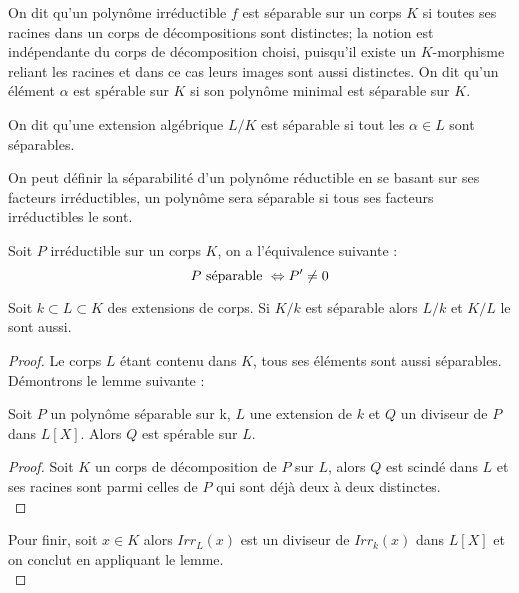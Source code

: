 \documentclass[a4paper]{article} %
\numberwithin{section}{part}
\numberwithin{equation}{section}
\begin{document}
\vspace{0.3cm}

On dit qu'un polynôme irréductible $f$ est séparable sur un corps $K$ si toutes
ses racines dans un corps de décompositions sont distinctes; la notion est
indépendante du corps de décomposition choisi, puisqu'il existe un $K$-morphisme
reliant les racines et dans ce cas leurs images sont aussi distinctes. On dit
qu'un élément $\alpha$ est spérable sur $K$ si son polynôme minimal est 
séparable sur $K$.

\begin{defn}
\label{def:sep}
On dit qu'une extension algébrique $L/K$ est séparable si tout les $\alpha\in L$
sont séparables.
\end{defn}

\begin{rem}
On peut définir la séparabilité d'un polynôme réductible en se basant sur ses
facteurs irréductibles, un polynôme sera séparable si tous ses facteurs
irréductibles le sont.
\end{rem}

\begin{prop}
\label{prop:sepderiv}
Soit $P$ irréductible sur un corps $K$, on a l'équivalence suivante :
\[P\textup{ séparable } \Leftrightarrow P'\neq 0\]
\end{prop}

\begin{prop}
Soit $k \subset L \subset K$ des extensions de corps. Si $K/k$ est séparable
alors $L/k$ et $K/L$ le sont aussi.
\end{prop}
\begin{proof}
Le corps $L$ étant contenu dans $K$, tous ses éléments sont aussi séparables.
Démontrons le lemme suivante :
\begin{lem}
\label{lem:divsep}
Soit $P$ un polynôme séparable sur k, $L$ une extension de $k$ et $Q$ un
diviseur de $P$ dans $L[X]$. Alors $Q$ est spérable sur $L$.
\end{lem}
\begin{proof}
Soit $K$ un corps de décomposition de $P$ sur $L$, alors $Q$ est scindé dans $L$
et ses racines sont parmi celles de $P$ qui sont déjà deux à deux distinctes.\\
\end{proof}
Pour finir, soit $x\in K$ alors $Irr_L(x)$ est un diviseur de $Irr_k(x)$ dans
$L[X]$ et on conclut en appliquant le lemme.\\
\end{proof}
\end{document}
